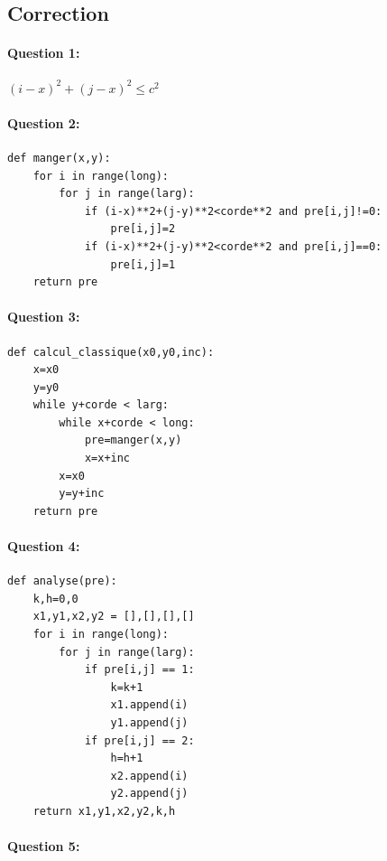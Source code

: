 \begin{solution}

\newpage

\section{Correction}

\paragraph{Question 1:} $(i-x)^2+(j-x)^2\leq c^2$

\paragraph{Question 2:} 
\begin{verbatim}
def manger(x,y):
    for i in range(long):
        for j in range(larg):
            if (i-x)**2+(j-y)**2<corde**2 and pre[i,j]!=0:
                pre[i,j]=2
            if (i-x)**2+(j-y)**2<corde**2 and pre[i,j]==0:
                pre[i,j]=1
    return pre
\end{verbatim}

\paragraph{Question 3:} 

\begin{verbatim}
def calcul_classique(x0,y0,inc):
    x=x0
    y=y0
    while y+corde < larg:
        while x+corde < long:
            pre=manger(x,y)
            x=x+inc
        x=x0
        y=y+inc
    return pre
\end{verbatim}

\paragraph{Question 4:} 

\begin{verbatim}
def analyse(pre):
    k,h=0,0    
    x1,y1,x2,y2 = [],[],[],[]
    for i in range(long):
        for j in range(larg):
            if pre[i,j] == 1:
                k=k+1
                x1.append(i)
                y1.append(j)
            if pre[i,j] == 2:
                h=h+1
                x2.append(i)
                y2.append(j)
    return x1,y1,x2,y2,k,h
\end{verbatim}

\paragraph{Question 5:} 


\end{solution}
